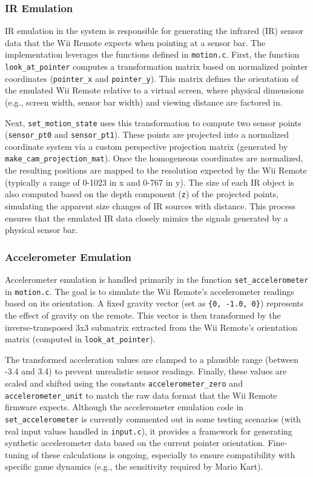 \subsubsection*{IR Emulation}

IR emulation in the system is responsible for generating the infrared (IR) sensor data that the Wii Remote expects when pointing at a sensor bar. The implementation leverages the functions defined in \texttt{motion.c}. First, the function \texttt{look\_at\_pointer} computes a transformation matrix based on normalized pointer coordinates (\texttt{pointer\_x} and \texttt{pointer\_y}). This matrix defines the orientation of the emulated Wii Remote relative to a virtual screen, where physical dimensions (e.g., screen width, sensor bar width) and viewing distance are factored in.

Next, \texttt{set\_motion\_state} uses this transformation to compute two sensor points (\texttt{sensor\_pt0} and \texttt{sensor\_pt1}). These points are projected into a normalized coordinate system via a custom perspective projection matrix (generated by \texttt{make\_cam\_projection\_mat}). Once the homogeneous coordinates are normalized, the resulting positions are mapped to the resolution expected by the Wii Remote (typically a range of 0-1023 in x and 0-767 in y). The size of each IR object is also computed based on the depth component (\texttt{z}) of the projected points, simulating the apparent size changes of IR sources with distance. This process ensures that the emulated IR data closely mimics the signals generated by a physical sensor bar.

\subsubsection*{Accelerometer Emulation}


Accelerometer emulation is handled primarily in the function \texttt{set\_accelerometer} in \texttt{motion.c}. The goal is to simulate the Wii Remote's accelerometer readings based on its orientation. A fixed gravity vector (set as \texttt{\{0, -1.0, 0\}}) represents the effect of gravity on the remote. This vector is then transformed by the inverse-transposed 3x3 submatrix extracted from the Wii Remote's orientation matrix (computed in \texttt{look\_at\_pointer}).

The transformed acceleration values are clamped to a plausible range (between -3.4 and 3.4) to prevent unrealistic sensor readings. Finally, these values are scaled and shifted using the constants \texttt{accelerometer\_zero} and \texttt{accelerometer\_unit} to match the raw data format that the Wii Remote firmware expects. Although the accelerometer emulation code in \texttt{set\_accelerometer} is currently commented out in some testing scenarios (with real input values handled in \texttt{input.c}), it provides a framework for generating synthetic accelerometer data based on the current pointer orientation. Fine-tuning of these calculations is ongoing, especially to ensure compatibility with specific game dynamics (e.g., the sensitivity required by Mario Kart).

